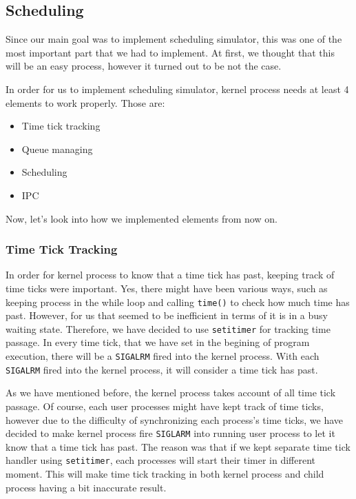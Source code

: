 \documentclass{homework}
\begin{document}
\subsection{Scheduling}
Since our main goal was to implement scheduling simulator, this was one of the most important part that we had to implement. At first, we thought that this will be an easy process, however it turned out to be not the case. 

In order for us to implement scheduling simulator, kernel process needs at least 4 elements to work properly. Those are:

\begin{itemize}
    \item Time tick tracking
    \item Queue managing
    \item Scheduling
    \item IPC
\end{itemize}
Now, let's look into how we implemented elements from now on.

\subsubsection{Time Tick Tracking}
In order for kernel process to know that a time tick has past, keeping track of time ticks were important. Yes, there might have been various ways, such as keeping process in the while loop and calling \texttt{time()} to check how much time has past. However, for us that seemed to be inefficient in terms of it is in a busy waiting state. Therefore, we have decided to use \texttt{setitimer} for tracking time passage. In every time tick, that we have set in the begining of program execution, there will be a \texttt{SIGALRM} fired into the kernel process. With each \texttt{SIGALRM} fired into the kernel process, it will consider a time tick has past. 

As we have mentioned before, the kernel process takes account of all time tick passage. Of course, each user processes might have kept track of time ticks, however due to the difficulty of synchronizing each process's time ticks, we have decided to make kernel process fire \texttt{SIGLARM} into running user process to let it know that a time tick has past. The reason was that if we kept separate time tick handler using \texttt{setitimer}, each processes will start their timer in different moment. This will make time tick tracking in both kernel process and child process having a bit inaccurate result.
\end{document}

